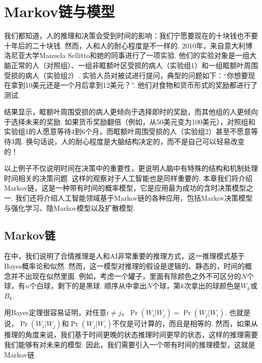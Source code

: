 \chapter{Markov链与模型}\label{chap:markov-chain}

我们都知道，人的推理和决策会受到时间的影响：我们宁愿要现在的十块钱也不要十年后的二十块钱. 然而，人和人的耐心程度是不一样的. 2010年，来自意大利博洛尼亚大学Manuela Sellitto和她的同事进行了一项实验. 他们的实验对象是一组大脑正常的人（对照组）、一组非眶额叶区受损的病人（实验组1）和一组眶额叶周围受损的病人（实验组2）. 实验人员对被试进行提问，典型的问题如下：“你想要现在拿到10美元还是一个月后拿到12美元？”. 他们对食物和货币形式的奖励都进行了测试. 

结果显示，眶额叶周围受损的病人更倾向于选择即时的奖励，而其他组的人更倾向于选择未来的奖励. 如果货币奖励翻倍（例如，从50美元变为100美元），对照组和实验组1的人愿意等待4到6个月，而眶额叶周围受损的人（实验组2）甚至不愿意等待3周. 换句话说，人的耐心程度是大脑结构决定的，而不是自己可以轻易改变的！

以上例子不仅说明时间在决策中的重要性，更说明人脑中有特殊的结构和机制处理时间相关的决策问题. 这样的观察对于人工智能也是同样重要的. 本章我们将介绍Markov链，这是一种带有时间的概率模型，它是应用最为成功的含时决策模型之一. 我们还将介绍人工智能领域基于Markov链的各种应用，包括Markov决策模型与强化学习、隐Markov模型以及扩散模型. 

\section{Markov链}

在中，我们说明了合情推理是人和AI非常重要的推理方式，这一推理模式基于Bayes概率论和似然. 然而，这一模型对推理的假设是逻辑的、静态的，时间的概念并不出现在似然里面. 例如，考虑一个罐子，里面有除颜色之外不可区分的$N$个球，有$n$个白球，剩下的是黑球. 顺序从中拿出$N$个球，第$k$次拿出的球颜色是$W_k$或$B_k$.

用Bayes定理很容易证明，对任意$i\neq j$，$\Pr(W_i|W_j)=\Pr(W_j|W_i)$. 也就是说，$\Pr(W_i|W_j)$和$\Pr(W_j|W_i)$不仅是可计算的，而且是相等的. 然而，如果从推理的角度来说，我们基于时间更晚的状态推理时间更早的状态，这样的推理需要我们能够有对未来的模型. 因此，我们需要引入一个带有时间的推理模型，这就是Markov链.

